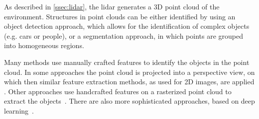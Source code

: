 As described in \cref{ssec:lidar}, the \gls{lidar} generates a 3D point cloud of the environment.
Structures in point clouds can be either identified by using an object detection approach, which allows for the identification of complex objects (e.g. cars or people), or a segmentation approach, in which points are grouped into homogeneous regions.

Many methods use manually crafted features to identify the objects in the point cloud.
In some approaches the point cloud is projected into a perspective view, on which then similar feature extraction methods, as used for 2D images, are applied
\cite{Premebida2014, Li2016}.
Other approaches use handcrafted features on a rasterized point cloud to extract the objects~\cite{Song2014, Song2016}.
There are also more sophisticated approaches, based on deep learning~\cite{Qi2017, Qi2017b, Zhuo2018}.

